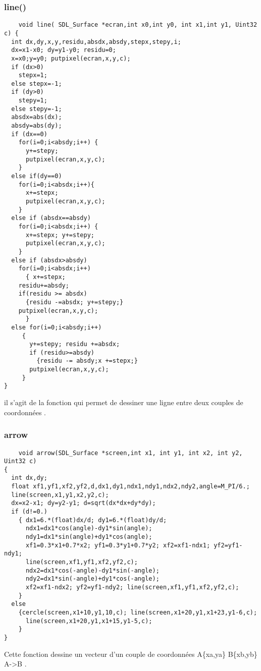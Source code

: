 \documentclass[a4paper,10pt]{report}
\begin{document}
     \subsubsection{line()}
      \begin{scriptsize}
	\begin{verbatim}
	void line( SDL_Surface *ecran,int x0,int y0, int x1,int y1, Uint32 c) {
  int dx,dy,x,y,residu,absdx,absdy,stepx,stepy,i;
  dx=x1-x0; dy=y1-y0; residu=0;
  x=x0;y=y0; putpixel(ecran,x,y,c);
  if (dx>0) 
    stepx=1;
  else stepx=-1; 
  if (dy>0) 
    stepy=1; 
  else stepy=-1;
  absdx=abs(dx);
  absdy=abs(dy);
  if (dx==0) 
    for(i=0;i<absdy;i++) { 
      y+=stepy;
      putpixel(ecran,x,y,c);
    }
  else if(dy==0) 
    for(i=0;i<absdx;i++){ 
      x+=stepx;
      putpixel(ecran,x,y,c); 
    }
  else if (absdx==absdy)
    for(i=0;i<absdx;i++) {
      x+=stepx; y+=stepy;
      putpixel(ecran,x,y,c);
    }
  else if (absdx>absdy)
    for(i=0;i<absdx;i++)
      { x+=stepx; 
	residu+=absdy;
	if(residu >= absdx) 
	  {residu -=absdx; y+=stepy;}
	putpixel(ecran,x,y,c);
      }
  else for(i=0;i<absdy;i++)
	 {
	   y+=stepy; residu +=absdx;
	   if (residu>=absdy) 
	     {residu -= absdy;x +=stepx;}
	   putpixel(ecran,x,y,c);
	 }
}
    \end{verbatim}
      \end{scriptsize}
	il s'agit de la fonction qui permet de dessiner une ligne entre deux couples de coordonnées .
     \subsubsection{arrow}
      \begin{scriptsize}
	\begin{verbatim}
	void arrow(SDL_Surface *screen,int x1, int y1, int x2, int y2, Uint32 c)
{
  int dx,dy;
  float xf1,yf1,xf2,yf2,d,dx1,dy1,ndx1,ndy1,ndx2,ndy2,angle=M_PI/6.;
  line(screen,x1,y1,x2,y2,c);
  dx=x2-x1; dy=y2-y1; d=sqrt(dx*dx+dy*dy);
  if (d!=0.)
    { dx1=6.*(float)dx/d; dy1=6.*(float)dy/d;
      ndx1=dx1*cos(angle)-dy1*sin(angle);
      ndy1=dx1*sin(angle)+dy1*cos(angle);
      xf1=0.3*x1+0.7*x2; yf1=0.3*y1+0.7*y2; xf2=xf1-ndx1; yf2=yf1-ndy1;
      line(screen,xf1,yf1,xf2,yf2,c);
      ndx2=dx1*cos(-angle)-dy1*sin(-angle);
      ndy2=dx1*sin(-angle)+dy1*cos(-angle);
      xf2=xf1-ndx2; yf2=yf1-ndy2; line(screen,xf1,yf1,xf2,yf2,c);
    }
  else
    {cercle(screen,x1+10,y1,10,c); line(screen,x1+20,y1,x1+23,y1-6,c);
      line(screen,x1+20,y1,x1+15,y1-5,c);
    }
}

	\end{verbatim}
      \end{scriptsize}
      Cette fonction dessine un vecteur d'un couple de coordonnées A\{xa,ya\} B\{xb,yb\}  A->B .
\end{document}

